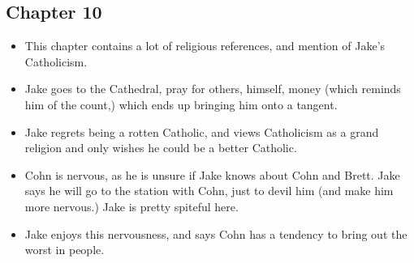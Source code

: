 \documentclass[11pt]{article}
\begin{document}
\subsection{Chapter 10}
\begin{itemize}
	\item This chapter contains a lot of religious references, and mention of
		Jake's Catholicism.
	\item Jake goes to the Cathedral, pray for others, himself, money (which
		reminds him of the count,) which ends up bringing him onto a tangent.
	\item Jake regrets being a rotten Catholic, and views Catholicism as a grand
		religion and only wishes he could be a better Catholic.
	\item Cohn is nervous, as he is unsure if Jake knows about Cohn and Brett.
		Jake says he will go to the station with Cohn, just to devil him (and 
		make him more nervous.)  Jake is pretty spiteful here.
	\item Jake enjoys this nervousness, and says Cohn has a tendency to bring
		out the worst in people.
\end{itemize}
\end{document}
